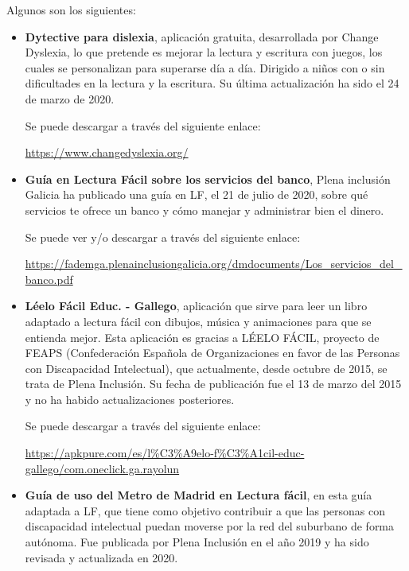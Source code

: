 Algunos son los siguientes:

\begin{itemize}
\item {\textbf{Dytective para dislexia}}, aplicación gratuita, desarrollada por Change Dyslexia, lo que pretende es mejorar la lectura y escritura con juegos, los cuales se personalizan para superarse día a día. Dirigido a niños con o sin dificultades en la lectura y la escritura. Su última actualización ha sido el 24 de marzo de 2020. 

Se puede descargar a través del siguiente enlace:

\href{https://www.changedyslexia.org/}{https://www.changedyslexia.org/}

\item {\textbf{Guía en Lectura Fácil sobre los servicios del banco}}, Plena inclusión Galicia ha publicado una guía en LF, el 21 de julio de 2020, sobre qué servicios te ofrece un banco y cómo manejar y administrar bien el dinero. 

Se puede ver y/o descargar a través del siguiente enlace:

\href{https://fademga.plenainclusiongalicia.org/dmdocuments/Los\_servicios\_del\_banco.pdf}{https://fademga.plenainclusiongalicia.org/dmdocuments/Los\_servicios\_del\_banco.pdf}


\item {\textbf{Léelo Fácil Educ. - Gallego}}, aplicación que sirve para leer un libro adaptado a lectura fácil con dibujos, música y animaciones para que se entienda mejor. Esta aplicación es gracias a LÉELO FÁCIL, proyecto de FEAPS (Confederación Española de Organizaciones en
favor de las Personas con Discapacidad Intelectual), que actualmente, desde octubre de 2015, se trata de Plena Inclusión. Su fecha de publicación fue el 13 de marzo del 2015 y no ha habido actualizaciones posteriores. 

Se puede descargar a través del siguiente enlace:

\href{https://apkpure.com/es/l\%C3\%A9elo-f\%C3\%A1cil-educ-gallego/com.oneclick.ga.rayoluna}{https://apkpure.com/es/l\%C3\%A9elo-f\%C3\%A1cil-educ-gallego/com.oneclick.ga.rayolun}

\item
{\textbf{Guía de uso del Metro de Madrid en Lectura fácil}}, en esta guía adaptada a LF, que tiene como objetivo contribuir a que las personas con discapacidad intelectual puedan moverse por la red del suburbano de forma autónoma. Fue publicada por Plena Inclusión en el año 2019 y ha sido revisada y actualizada en 2020. 


\end{itemize}

